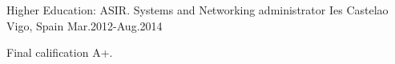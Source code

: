 

\begin{cventries}

  \cventry
    {Higher Education: ASIR. Systems and Networking administrator} %
    {Ies Castelao} %
    {Vigo, Spain} %
    {Mar.2012-Aug.2014} %
    {
      \begin{cvitems} %
        \item {Final calification A+.}
      \end{cvitems}
    }

\end{cventries}
